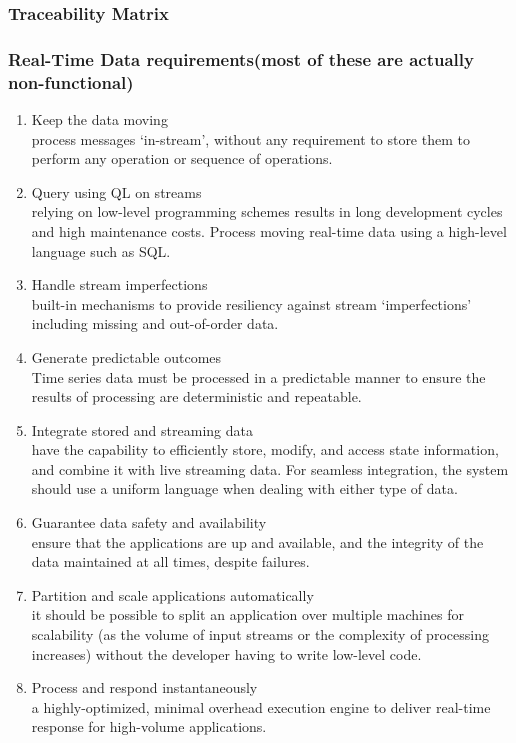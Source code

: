\documentclass[12pt]{article}
\begin{document}
{{		\subsubsection{Traceability Matrix}
		\subsubsection{Real-Time Data requirements(most of these are actually non-functional)}
        	\begin{enumerate}
            	\item{Keep the data moving\\process messages ‘in-stream’, without any requirement to store them to perform any operation or sequence of operations.}
                \item{Query using QL on streams\\relying on low-level programming schemes results in long development cycles and high maintenance costs. Process moving real-time data using a high-level language such as SQL.}
                \item{Handle stream imperfections\\ built-in mechanisms to provide resiliency against stream ‘imperfections’ including missing and out-of-order data.}
                \item{Generate predictable outcomes\\Time series data must be processed in a predictable manner to ensure the results of processing are deterministic and repeatable.}
                \item{Integrate stored and streaming data\\have the capability to efficiently store, modify, and access state information, and combine it with live streaming data. For seamless integration, the system should use a uniform language when dealing with either type of data.}
                \item{Guarantee data safety and availability\\ ensure that the applications are up and available, and the integrity of the data maintained at all times, despite failures.}
                \item{Partition and scale applications automatically\\ it should be possible to split an application over multiple machines for scalability (as the volume of input streams or the complexity of processing increases) without the developer having to write low-level code.}
                \item{Process and respond instantaneously\\a highly-optimized, minimal overhead execution engine to deliver real-time response for high-volume applications.}
            \end{enumerate}

}}
\end{document}
